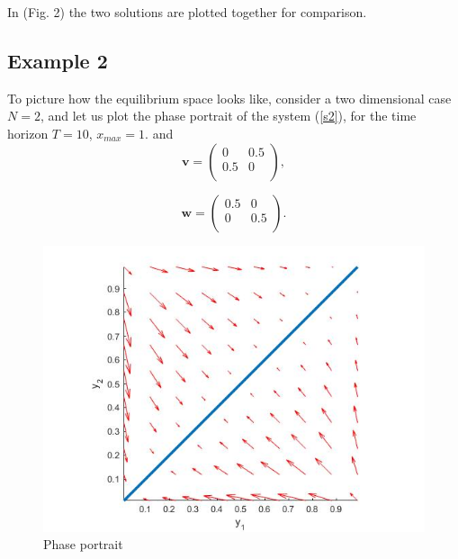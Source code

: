 \documentclass[a4paper,10pt, english]{article}
\begin{document}
In (Fig. 2) the two solutions are plotted together for comparison.

\newpage

\subsection{Example 2}
To picture how the equilibrium space looks like, consider a two dimensional case  $N=2$, and let us plot the phase portrait of the system (\ref{s2}), for the time horizon $T = 10$, $x_{max} = 1$. and
$$
\mathbf{v} = 
\left(
\begin{matrix}
0 & 0.5  \\
0.5 & 0 \\
\end{matrix}
\right),
$$

$$
\mathbf{w} = 
\left(
\begin{matrix}
0.5 & 0 \\
0 & 0.5 \\
\end{matrix}
\right).
$$

\begin{figure}[ht]
\label{fig_c3}
\centering
\includegraphics[scale= 0.4]{3.jpg}
\caption{Phase portrait}
\end{figure}
\end{document}
